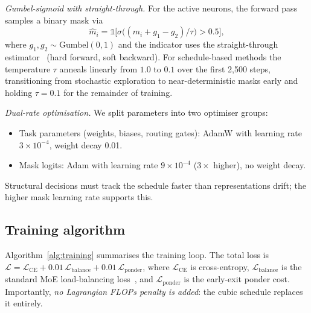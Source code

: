 \documentclass[fleqn,10pt]{article}
\begin{document}
\textit{Gumbel-sigmoid with straight-through.} For the active
neurons, the forward pass samples a binary mask via
\begin{equation}
\hat{m}_i = \mathbb{1}\bigl[\sigma\bigl((m_i + g_1 - g_2)/\tau\bigr)
 > 0.5\bigr],
\end{equation}
where $g_1, g_2 \sim \mathrm{Gumbel}(0,1)$ and the indicator uses the
straight-through estimator~\citep{bengio2013estimating} (hard forward,
soft backward). For schedule-based methods the temperature $\tau$
anneals linearly from $1.0$ to $0.1$ over the first 2{,}500 steps,
transitioning from stochastic exploration to near-deterministic
masks early and holding $\tau{=}0.1$ for the remainder of training.

\textit{Dual-rate optimisation.} We split parameters into two
optimiser groups:
\begin{itemize}
  \item Task parameters (weights, biases, routing gates): AdamW
  with learning rate $3\times10^{-4}$, weight decay 0.01.
  \item Mask logits: Adam with learning rate $9\times10^{-4}$
  ($3\times$ higher), no weight decay.
\end{itemize}
Structural decisions must track the schedule faster than
representations drift; the higher mask learning rate supports this.

\subsection*{Training algorithm}

Algorithm~\ref{alg:training} summarises the training loop. The total
loss is
$\mathcal{L} = \mathcal{L}_{\mathrm{CE}} + 0.01\,\mathcal{L}_{\mathrm{balance}}
 + 0.01\,\mathcal{L}_{\mathrm{ponder}}$,
where $\mathcal{L}_{\mathrm{CE}}$ is cross-entropy,
$\mathcal{L}_{\mathrm{balance}}$ is the standard MoE load-balancing
loss~\citep{fedus2022switch}, and $\mathcal{L}_{\mathrm{ponder}}$ is
the early-exit ponder cost. Importantly, \emph{no Lagrangian FLOPs
penalty is added}: the cubic schedule replaces it entirely.
\end{document}
